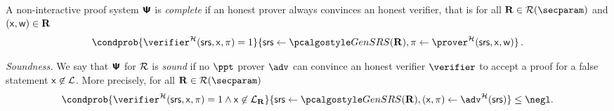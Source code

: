 \documentclass{llncs}
\newcommand{\ourpar}[1] {\smallskip\noindent\emph{#1}}
\begin{document}
  A non-interactive proof system $\bm{\mathsf{\Psi}}$ is
  \emph{complete} if an honest prover always convinces an honest verifier, that
  is for all $\REL \in \RELGEN(\secparam)$ and $(\mathsf{x}, \mathsf{w}) \in \mathbf{R}$
	\[
		\condprob{\verifier^\ro (\srs, \inp, \zkproof) = 1} {\srs \gets \kgen(\REL),
      \zkproof \gets \prover^\ro (\srs, \inp, \wit)}\,.
	\]

\ourpar{Soundness.}
    We say that $\bm{\mathsf{\Psi}}$ for $\mathcal{R}$ is \emph{sound} if no
  $\ppt$ prover $\adv$ can convince an honest verifier $\verifier$ to accept a
  proof for a false statement $\mathsf{x} \not\in\mathcal{L}$. More precisely, for
  all $\REL \in \RELGEN(\secparam)$
	\[
    \condprob{ \verifier^\ro (\srs, \inp, \zkproof) = 1 \land \inp \not\in
      \LANG_\REL}{\srs \gets \kgen(\REL), (\inp, \zkproof) \gets \adv^\ro(\srs)} \leq
    \negl.
	\]

\fi
 
\end{document}
